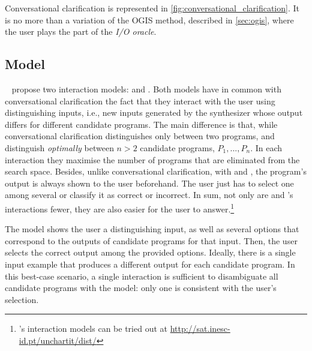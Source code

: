 Conversational clarification is represented in \autoref{fig:conversational_clarification}. It is no more than a variation of the \ac{OGIS} method, described in \autoref{sec:ogis}, where the user plays the part of the \textit{I/O oracle}.


\subsection{\optmodel Model}\label{sec:rel-opt-interaction}

\citeauthor{UnchartIt20}~\cite{UnchartIt20,unchartit-webpage} propose two interaction models: \optmodel and \ynmodel.
Both models have in common with conversational clarification the fact that they interact with the user using distinguishing inputs, i.e., new inputs generated by the synthesizer whose output differs for different candidate programs. 
The main difference is that, while conversational clarification distinguishes only between two programs, \optmodel and \ynmodel distinguish \textit{optimally} between \(n > 2\) candidate programs, \(P_1, ..., P_n\).
In each interaction they maximise the number of programs that are eliminated from the search space. Besides, unlike conversational clarification, with \optmodel and \ynmodel, the program's output is always shown to the user beforehand.
The user just has to select one among several or classify it as correct or incorrect.
In sum, not only are \optmodel and \ynmodel's interactions fewer, they are also easier for the user to answer.\footnote{\UnchartIt's interaction models can be tried out at \url{http://sat.inesc-id.pt/unchartit/dist/}}

The \optmodel model shows the user a distinguishing input, as well as several options that correspond to the outputs of candidate programs for that input. Then, the user selects the correct output among the provided options.
Ideally, there is a single input example that produces a different output for each candidate program.
In this best-case scenario, a single interaction is sufficient to disambiguate all candidate programs with the \optmodel model: only one is consistent with the user's selection.

